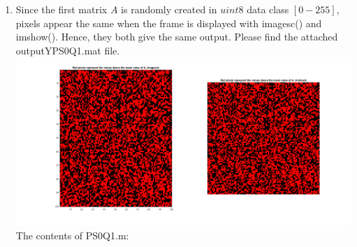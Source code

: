 \documentclass{article}
\begin{document}
\begin{enumerate}
\begin{enumerate}
				\item Since the first matrix $A$ is randomly created in $uint8$ data class
				$[0-255]$, pixels appear the same when the frame is displayed with imagesc()
				and imshow(). Hence, they both give the same output. Please find the
				attached outputYPS0Q1.mat file. \\ 
				\includegraphics[width=\linewidth]{plots/1-A-4/e.png}
				The contents of PS0Q1.m: \\
				
			\end{enumerate}
		
	\end{enumerate}
\end{document}
